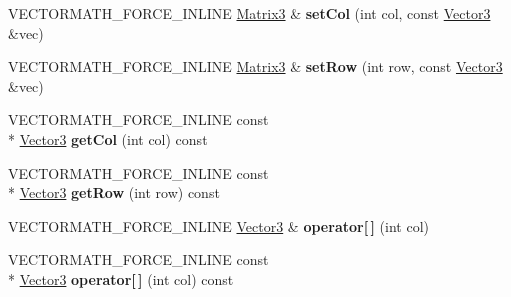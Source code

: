 \begin{DoxyCompactItemize}
\item 
\hypertarget{class_vectormath_1_1_aos_1_1_matrix3_af4ffa007f94bfbe10d7e0256eba7b25d}{V\+E\+C\+T\+O\+R\+M\+A\+T\+H\+\_\+\+F\+O\+R\+C\+E\+\_\+\+I\+N\+L\+I\+N\+E \hyperlink{class_vectormath_1_1_aos_1_1_matrix3}{Matrix3} \& {\bfseries set\+Col} (int col, const \hyperlink{class_vectormath_1_1_aos_1_1_vector3}{Vector3} \&vec)}\label{class_vectormath_1_1_aos_1_1_matrix3_af4ffa007f94bfbe10d7e0256eba7b25d}

\item 
\hypertarget{class_vectormath_1_1_aos_1_1_matrix3_a99430a86fcb7a83ae5bf226d90921d17}{V\+E\+C\+T\+O\+R\+M\+A\+T\+H\+\_\+\+F\+O\+R\+C\+E\+\_\+\+I\+N\+L\+I\+N\+E \hyperlink{class_vectormath_1_1_aos_1_1_matrix3}{Matrix3} \& {\bfseries set\+Row} (int row, const \hyperlink{class_vectormath_1_1_aos_1_1_vector3}{Vector3} \&vec)}\label{class_vectormath_1_1_aos_1_1_matrix3_a99430a86fcb7a83ae5bf226d90921d17}

\item 
\hypertarget{class_vectormath_1_1_aos_1_1_matrix3_a7e992c9efa94394ba60ed072412de09a}{V\+E\+C\+T\+O\+R\+M\+A\+T\+H\+\_\+\+F\+O\+R\+C\+E\+\_\+\+I\+N\+L\+I\+N\+E const \\*
\hyperlink{class_vectormath_1_1_aos_1_1_vector3}{Vector3} {\bfseries get\+Col} (int col) const }\label{class_vectormath_1_1_aos_1_1_matrix3_a7e992c9efa94394ba60ed072412de09a}

\item 
\hypertarget{class_vectormath_1_1_aos_1_1_matrix3_a68e74b75bf5a5865adc4989b62607e09}{V\+E\+C\+T\+O\+R\+M\+A\+T\+H\+\_\+\+F\+O\+R\+C\+E\+\_\+\+I\+N\+L\+I\+N\+E const \\*
\hyperlink{class_vectormath_1_1_aos_1_1_vector3}{Vector3} {\bfseries get\+Row} (int row) const }\label{class_vectormath_1_1_aos_1_1_matrix3_a68e74b75bf5a5865adc4989b62607e09}

\item 
\hypertarget{class_vectormath_1_1_aos_1_1_matrix3_a6978cc9868019aedcbd3eeaf9f5d48f1}{V\+E\+C\+T\+O\+R\+M\+A\+T\+H\+\_\+\+F\+O\+R\+C\+E\+\_\+\+I\+N\+L\+I\+N\+E \hyperlink{class_vectormath_1_1_aos_1_1_vector3}{Vector3} \& {\bfseries operator\mbox{[}$\,$\mbox{]}} (int col)}\label{class_vectormath_1_1_aos_1_1_matrix3_a6978cc9868019aedcbd3eeaf9f5d48f1}

\item 
\hypertarget{class_vectormath_1_1_aos_1_1_matrix3_ad4d4fb98a627a3627c6d883a78e9c7f9}{V\+E\+C\+T\+O\+R\+M\+A\+T\+H\+\_\+\+F\+O\+R\+C\+E\+\_\+\+I\+N\+L\+I\+N\+E const \\*
\hyperlink{class_vectormath_1_1_aos_1_1_vector3}{Vector3} {\bfseries operator\mbox{[}$\,$\mbox{]}} (int col) const }\label{class_vectormath_1_1_aos_1_1_matrix3_ad4d4fb98a627a3627c6d883a78e9c7f9}


\end{DoxyCompactItemize}
